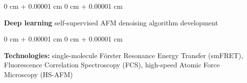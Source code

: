 \documentclass[10pt, letterpaper]{article}
\newenvironment{onecolentry}{
        \begin{adjustwidth}{
                        0 cm + 0.00001 cm
                }{
                        0 cm + 0.00001 cm
                }
        }{
        \end{adjustwidth}
} %
\begin{document}
\vspace{0.2 cm}

\begin{onecolentry}
        \textbf{Deep learning} self-supervised AFM denoising algorithm development
\end{onecolentry}

\vspace{0.2 cm}

\begin{onecolentry}
        \textbf{Technologies:} single-molecule Förster Resonance Energy Transfer (smFRET), Fluorescence Correlation Spectroscopy (FCS), high-speed Atomic Force Microscopy (HS-AFM)
\end{onecolentry}
\end{document}
